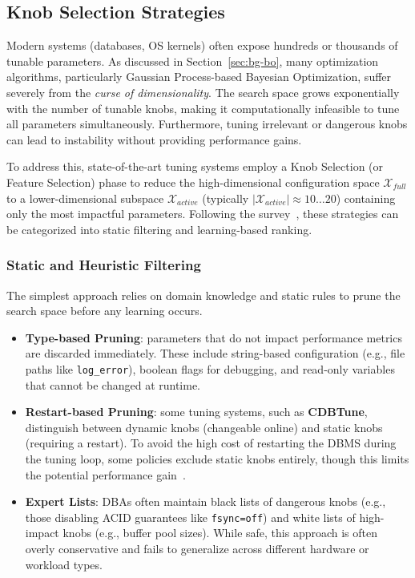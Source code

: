 \subsection{Knob Selection Strategies}\label{sec:bg-knob-selection}

Modern systems (databases, OS kernels) often expose hundreds or thousands of tunable parameters.
As discussed in Section~\ref{sec:bg-bo}, many optimization algorithms, particularly Gaussian Process-based Bayesian Optimization, suffer severely from the \textit{curse of dimensionality}.
The search space grows exponentially with the number of tunable knobs, making it computationally infeasible to tune all parameters simultaneously.
Furthermore, tuning irrelevant or dangerous knobs can lead to instability without providing performance gains.

To address this, state-of-the-art tuning systems employ a Knob Selection (or Feature Selection) phase to reduce the high-dimensional configuration space $\mathcal{X}_{full}$ to a lower-dimensional subspace $\mathcal{X}_{active}$ (typically $|\mathcal{X}_{active}| \approx 10 \dots 20$) containing only the most impactful parameters.
Following the survey~\cite{autotune_survey}, these strategies can be categorized into static filtering and learning-based ranking.

\subsubsection{Static and Heuristic Filtering}

The simplest approach relies on domain knowledge and static rules to prune the search space before any learning occurs.
\begin{itemize}
  \item \textbf{Type-based Pruning}: parameters that do not impact performance metrics are discarded immediately. These include string-based configuration (e.g., file paths like \texttt{log\_error}), boolean flags for debugging, and read-only variables that cannot be changed at runtime.
  \item \textbf{Restart-based Pruning}: some tuning systems, such as \textbf{CDBTune}, distinguish between dynamic knobs (changeable online) and static knobs (requiring a restart). To avoid the high cost of restarting the DBMS during the tuning loop, some policies exclude static knobs entirely, though this limits the potential performance gain~\cite{cdbtune}.
  \item \textbf{Expert Lists}: DBAs often maintain black lists of dangerous knobs (e.g., those disabling ACID guarantees like \texttt{fsync=off}) and white lists of high-impact knobs (e.g., buffer pool sizes). While safe, this approach is often overly conservative and fails to generalize across different hardware or workload types.
\end{itemize}

